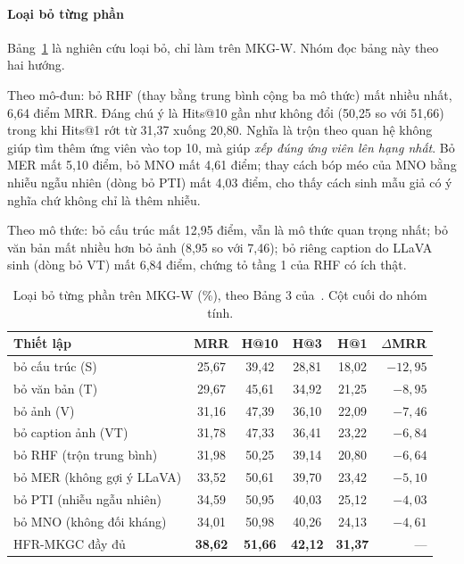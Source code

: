 \documentclass[conference,a4paper]{IEEEtran}
\begin{document}
\paragraph{Loại bỏ từng phần} Bảng~\ref{tab:ablation} là nghiên cứu loại bỏ, chỉ làm trên MKG-W. Nhóm đọc bảng này theo hai hướng.

Theo mô-đun: bỏ RHF (thay bằng trung bình cộng ba mô thức) mất nhiều nhất, 6{,}64 điểm MRR. Đáng chú ý là Hits@10 gần như không đổi (50{,}25 so với 51{,}66) trong khi Hits@1 rớt từ 31{,}37 xuống 20{,}80. Nghĩa là trộn theo quan hệ không giúp tìm thêm ứng viên vào top 10, mà giúp \emph{xếp đúng ứng viên lên hạng nhất}. Bỏ MER mất 5{,}10 điểm, bỏ MNO mất 4{,}61 điểm; thay cách bóp méo của MNO bằng nhiễu ngẫu nhiên (dòng bỏ PTI) mất 4{,}03 điểm, cho thấy cách sinh mẫu giả có ý nghĩa chứ không chỉ là thêm nhiễu.

Theo mô thức: bỏ cấu trúc mất 12{,}95 điểm, vẫn là mô thức quan trọng nhất; bỏ văn bản mất nhiều hơn bỏ ảnh (8{,}95 so với 7{,}46); bỏ riêng caption do LLaVA sinh (dòng bỏ VT) mất 6{,}84 điểm, chứng tỏ tầng 1 của RHF có ích thật.

\begin{table}[t]
\centering
\caption{Loại bỏ từng phần trên MKG-W (\%), theo Bảng 3 của~\cite{hfrmkgc}. Cột cuối do nhóm tính.}
\label{tab:ablation}
\footnotesize
\setlength{\tabcolsep}{4pt}
\begin{tabular}{l cccc r}
\toprule
Thiết lập & MRR & H@10 & H@3 & H@1 & $\Delta$MRR\\
\midrule
bỏ cấu trúc (S)               & 25{,}67 & 39{,}42 & 28{,}81 & 18{,}02 & $-12{,}95$\\
bỏ văn bản (T)                & 29{,}67 & 45{,}61 & 34{,}92 & 21{,}25 & $-8{,}95$\\
bỏ ảnh (V)                    & 31{,}16 & 47{,}39 & 36{,}10 & 22{,}09 & $-7{,}46$\\
bỏ caption ảnh (VT)           & 31{,}78 & 47{,}33 & 36{,}41 & 23{,}22 & $-6{,}84$\\
\midrule
bỏ RHF (trộn trung bình)      & 31{,}98 & 50{,}25 & 39{,}14 & 20{,}80 & $-6{,}64$\\
bỏ MER (không gợi ý LLaVA)    & 33{,}52 & 50{,}61 & 39{,}70 & 23{,}42 & $-5{,}10$\\
bỏ PTI (nhiễu ngẫu nhiên)     & 34{,}59 & 50{,}95 & 40{,}03 & 25{,}12 & $-4{,}03$\\
bỏ MNO (không đối kháng)      & 34{,}01 & 50{,}98 & 40{,}26 & 24{,}13 & $-4{,}61$\\
\midrule
HFR-MKGC đầy đủ               & \textbf{38{,}62} & \textbf{51{,}66} & \textbf{42{,}12} & \textbf{31{,}37} & ---\\
\bottomrule
\end{tabular}
\end{table}
\end{document}
